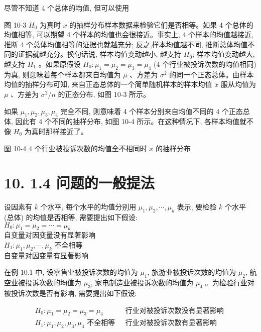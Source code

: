 \documentclass[10pt]{article}
\begin{document}
\begin{CJK*}{UTF8}{bsmi}
尽管不知道 4 个总体的均值, 但可以使用

\begin{center}
\end{center}

图 10-3 $H_{0}$ 为真时 $x$ 的抽样分布样本数据来检验它们是否相等。如果 4 个总体的均值相等, 可以期望 4 个样本的均值也会很接近。事实上, 4 个样本的均值越接近, 推断 4 个总体均值相等的证据也就越充分; 反之,样本均值越不同, 推断总体均值不同的证据就越充分。换句话说, 样本均值变动越小, 越支持 $H_{0}$; 样本均值变动越大, 越支持 $H_{1}$ 。如果原假设 $H_{0}: \mu_{1}=\mu_{2}=\mu_{3}=\mu_{4}$ (4 个行业被投诉次数的均值相同) 为真, 则意味着每个样本都来自均值为 $\mu$ 、方差为 $\sigma^{2}$ 的同一个正态总体。由样本均值的抽样分布可知, 来自正态总体的一个简单随机样本的样本均值 $\bar{x}$ 服从均值为 $\mu$ 、方差为 $\sigma^{2} / n$ 的正态分布, 如图 10-3 所示。

如果 $\mu_{1}, \mu_{2}, \mu_{3}, \mu_{4}$ 完全不同, 则意味着 4 个样本分别来自均值不同的 4 个正态总体, 因此有 4 个不同的抽样分布, 如图 10-4 所示。在这种情况下, 各样本均值就不像 $H_{0}$ 为真时那样接近了。

\begin{center}
\end{center}

图 10-4 4 个行业被投诉次数的均值全不相同时 $x$ 的抽样分布

\section*{10. 1.4 问题的一般提法}
设因素有 $k$ 个水平, 每个水平的均值分别用 $\mu_{1}, \mu_{2}, \cdots, \mu_{k}$ 表示, 要检验 $k$ 个水平 (总体) 的均值是否相等, 需要提出如下假设:\\
$H_{0}: \mu_{1}=\mu_{2}=\cdots=\mu_{k}$\\
自变量对因变量没有显著影响\\
$H_{1}: \mu_{1}, \mu_{2}, \cdots, \mu_{k}$ 不全相等\\
自变量对因变量有显著影响

在例 10.1 中, 设零售业被投诉次数的均值为 $\mu_{1}$, 旅游业被投诉次数的均值为 $\mu_{2}$, 航空业被投诉次数的均值为 $\mu_{3}$, 家电制造业被投诉次数的均值为 $\mu_{4}$ 。为检验行业对被投诉次数是否有影响, 需要提出如下假设:

$$
\begin{array}{ll}
H_{0}: \mu_{1}=\mu_{2}=\mu_{3}=\mu_{4} & \text { 行业对被投诉次数没有显著影响 } \\
H_{1}: \mu_{1}, \mu_{2}, \mu_{3}, \mu_{4} \text { 不全相等 } & \text { 行业对被投诉次数有显著影响 }
\end{array}
$$


\end{CJK*}
\end{document}
